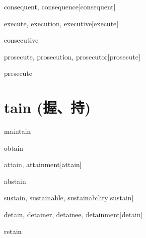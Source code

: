\begin{wordRef}{consequent, consequence}[consequent]
\end{wordRef}

\begin{wordRef}{execute, execution, executive}[execute]
\end{wordRef}

\begin{wordRef}{consecutive}
\end{wordRef}

\begin{wordRef}{prosecute, prosecution, prosecutor}[prosecute]
\end{wordRef}

\begin{wordRef}{presecute}
\end{wordRef}

\section{tain (握、持)}

\begin{wordRef}{maintain}
\end{wordRef}

\begin{wordRef}{obtain}
\end{wordRef}

\begin{wordRef}{attain, attainment}[attain]
\end{wordRef}

\begin{wordRef}{abstain}
\end{wordRef}

\begin{wordRef}{sustain, sustainable, sustainability}[sustain]
\end{wordRef}

\begin{wordRef}{detain, detainer, detainee, detainment}[detain]
\end{wordRef}

\begin{wordRef}{retain}
\end{wordRef}